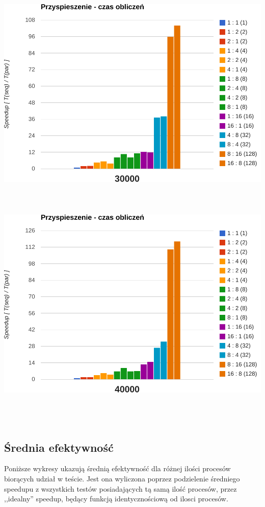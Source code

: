\documentclass[paper=a4, fontsize=11pt]{scrartcl}	%
\numberwithin{equation}{section}		%
\numberwithin{figure}{section}			%
\numberwithin{table}{section}				%
\begin{document}
\includegraphics[width=135mm]{report/comp-speedup-30000.pdf} \\ \ \\ \ \\ \ \\

\includegraphics[width=135mm]{report/comp-speedup-40000.pdf} \\ \ \\ \ \\ \ \\


\subsection{Średnia efektywność}

Poniższe wykresy ukazują średnią efektywność dla różnej ilości procesów
biorących udział w teście. Jest ona wyliczona poprzez podzielenie średniego
speedupu z wszystkich testów posiadających tą samą ilość procesów, przez
,,idealny'' speedup, będący funkcją identycznościową od ilosci procesów. \\
\end{document}
